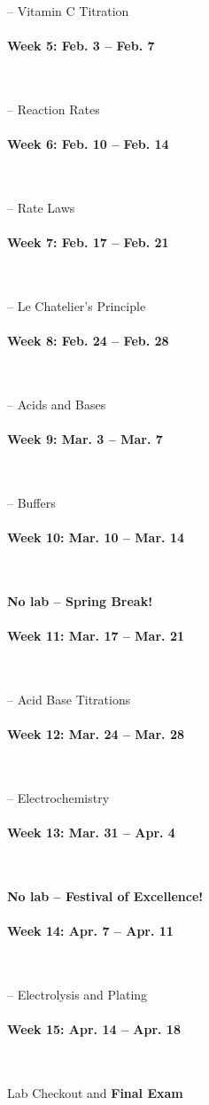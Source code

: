 \documentclass[12pt, letterpaper]{article}
\begin{document}
-- Vitamin C Titration

\paragraph{Week 5: Feb. 3 -- Feb. 7}~

-- Reaction Rates

\paragraph{Week 6: Feb. 10 -- Feb. 14}~

-- Rate Laws

\paragraph{Week 7: Feb. 17 -- Feb. 21}~

-- Le Chatelier's Principle

\paragraph{Week 8: Feb. 24 -- Feb. 28}~

-- Acids and Bases

\paragraph{Week 9: Mar. 3 -- Mar. 7}~

-- Buffers

\paragraph{Week 10: Mar. 10 -- Mar. 14}~

\textbf{No lab -- Spring Break!}

\paragraph{Week 11: Mar. 17 -- Mar. 21}~

-- Acid Base Titrations

\paragraph{Week 12: Mar. 24 -- Mar. 28}~

-- Electrochemistry

\paragraph{Week 13: Mar. 31 -- Apr. 4}~

\textbf{No lab -- Festival of Excellence!}

\paragraph{Week 14: Apr. 7 -- Apr. 11}~

-- Electrolysis and Plating

\paragraph{Week 15: Apr. 14 -- Apr. 18}~

Lab Checkout and \textbf{Final Exam}
\end{document}
